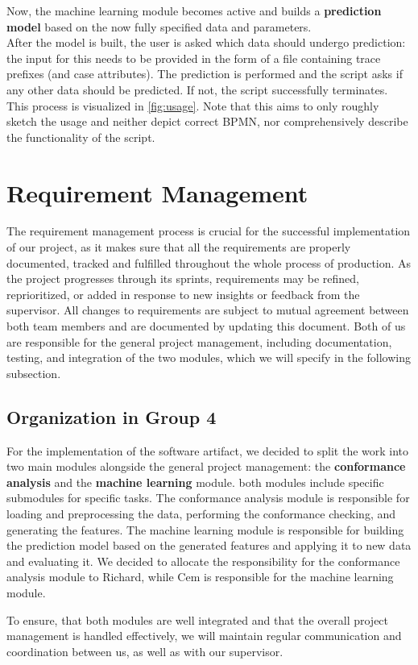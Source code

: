 \documentclass[12pt,a4paper]{article}
\begin{document}
Now, the machine learning module becomes active and builds a \textbf{prediction model} based on the now fully specified data and parameters. \\ 
After the model is built, the user is asked which data should undergo prediction: the input for this needs to be provided in the form of a file containing trace prefixes (and case attributes).
The prediction is performed and the script asks if any other data should be predicted. If not, the script successfully terminates.
This process is visualized in \ref{fig:usage}. Note that this aims to only roughly sketch the usage and neither depict correct BPMN, nor comprehensively describe the functionality of the script.
\section{Requirement Management}
The requirement management process is crucial for the successful implementation of our project, as it makes sure that all the requirements are properly documented, tracked and fulfilled throughout the whole process of production. As the project progresses through its sprints, requirements may be refined, reprioritized, or added in response to new insights or feedback from the supervisor. All changes to requirements are subject to mutual agreement between both team members and are documented by updating this document.
Both of us are responsible for the general project management, including documentation, testing, and integration of the two modules, which we will specify in the following subsection.
\subsection{Organization in Group 4}
For the implementation of the software artifact, we decided to split the work into two main modules alongside the general project management: the \textbf{conformance analysis} and the \textbf{machine learning} module. both modules include specific submodules for specific tasks. The conformance analysis module is responsible for loading and preprocessing the data, performing the conformance checking, and generating the features. The machine learning module is responsible for building the prediction model based on the generated features and applying it to new data and evaluating it. We decided to allocate the responsibility for the conformance analysis module to Richard, while Cem is responsible for the machine learning module.

To ensure, that both modules are well integrated and that the overall project management is handled effectively, we will maintain regular communication and coordination between us, as well as with our supervisor. 
\end{document}
